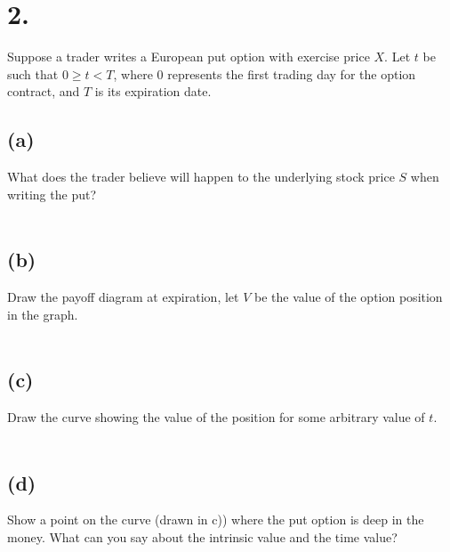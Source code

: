 \documentclass{article}
\begin{document}
\section*{2.}
{\Large

Suppose a trader writes a European put option with exercise price $X$.  Let $t$ be such that $0 \geq t < T$, where 0 represents the first trading day for the option contract, and $T$ is its expiration date.

\subsection*{(a)}

What does the trader believe will happen to the underlying stock price $S$ when writing the put? \\ \\


\subsection*{(b)}

Draw the payoff diagram at expiration, let $V$ be the value of the option position in the graph. \\ \\


\subsection*{(c)}

Draw the curve showing the value of the position for some arbitrary value of $t$. \\ \\


\subsection*{(d)}

Show a point on the curve (drawn in c)) where the put option is deep in the money. What can you say about the intrinsic value and the time value? \\ \\

}
\end{document}

